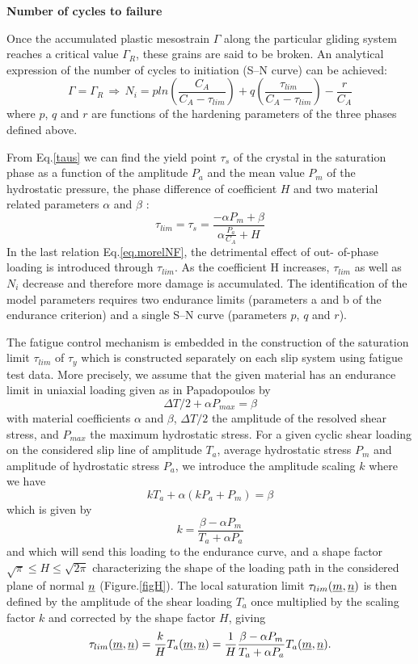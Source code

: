 \textbf{Number of cycles to failure}

Once the accumulated plastic mesostrain $\Gamma$ along the particular gliding system reaches a critical value $\Gamma_R$, these grains are said to be broken. An analytical expression of the number
of cycles to initiation (S–N curve) can be achieved:
\begin{equation}
\Gamma=\Gamma_R \, \Rightarrow \, N_i=pln\left(\frac{C_A}{C_A-\tau_{lim}}\right)+q\left(\frac{\tau_{lim}}{C_A-\tau_{lim}}\right)-\frac{r}{C_A}
\label{eq.morelNF}
\end{equation}
where $p$, $q$ and $r$ are functions of the hardening parameters of the three phases defined above.

From Eq.\eqref{taus} we can find the yield point $\tau_s$ of the crystal in the saturation phase as a function of the amplitude $P_a$ and the mean value $P_m$ of the hydrostatic pressure, the phase difference of coefficient $H$ and two material related parameters $\alpha$ and $\beta$ :
\begin{equation}
\tau_{lim}=\tau_s=\frac{-\alpha P_m+\beta}{\alpha\frac{P_a}{C_A}+H}
\label{taus}
\end{equation}
In the last relation Eq.\eqref{eq.morelNF}, the detrimental effect of out-
of-phase loading is introduced through $\tau_{lim}$. As the coefficient H increases, $\tau_{lim}$ as well as $N_i$ decrease and therefore more damage is accumulated. The identification of
the model parameters requires two endurance limits
(parameters a and b of the endurance criterion) and a
single S–N curve (parameters $p$, $q$ and $r$).

The fatigue control mechanism is embedded in the construction of the saturation limit $\tau_{lim}$ of $\tau_y$ which is constructed separately on each slip system using fatigue test data. More precisely, we assume that the given material has an endurance limit in uniaxial loading given as in Papadopoulos by
$$\Delta T/2+\alpha P_{max}=\beta$$
with material coefficients $\alpha$ and $\beta$, $\Delta T/2$ the amplitude of the resolved shear stress, and $P_{max}$ the maximum hydrostatic stress. For a given cyclic shear loading on the considered slip line of amplitude $T_a$, average hydrostatic stress $P_m$ and amplitude of hydrostatic stress $P_a$, we introduce the amplitude scaling $k$ where we have
$$kT_a+\alpha\left( kP_a+P_m\right)=\beta  $$
which is given by
 $$ k=\dfrac{\beta-\alpha P_m}{T_a+\alpha P_a}$$ 
 and which will send this loading to the endurance curve, and a shape factor $\sqrt{\pi}\leqslant H\leqslant \sqrt{2\pi}$ characterizing the shape of the loading path in the considered plane of normal $\uline{n}$ (Figure.\ref{figH}). The local saturation limit $\tau_{lim}(\uline{m},\uline{n})$ is then defined by the amplitude of the shear loading $T_a$ once multiplied by the scaling factor $k$ and corrected by the shape factor $H$, giving
$$\tau_{lim}(\uline{m},\uline{n})=\frac{k}{H}T_a(\uline{m},\uline{n})=\frac{1}{H}\frac{\beta-\alpha P_m}{T_a+\alpha P_a}T_a(\uline{m},\uline{n}).$$


